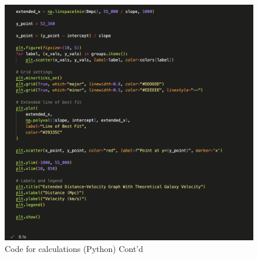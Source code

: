 \documentclass[12pt]{article}
\begin{document}
\begin{figure}[H]
    \centering
    \includegraphics[width=\textwidth]{HUBBLEcode3.png}
    \caption{\centering Code for calculations (Python) Cont'd}
    \label{fig:code3}  
\end{figure}
\end{document}
